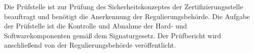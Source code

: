 Die Prüfstelle ist zur Prüfung des Sicherheitskonzeptes der Zertifizierungsstelle beauftragt und benötigt die Anerkennung der Regulierungsbehörde. Die Aufgabe der Prüfstelle ist die Kontrolle und Abnahme der Hard- und Softwarekomponenten gemäß dem Signaturgesetz. Der Prüfbericht wird anschließend von der Regulierungsbehörde veröffentlicht. \cite{standdeswissens3}